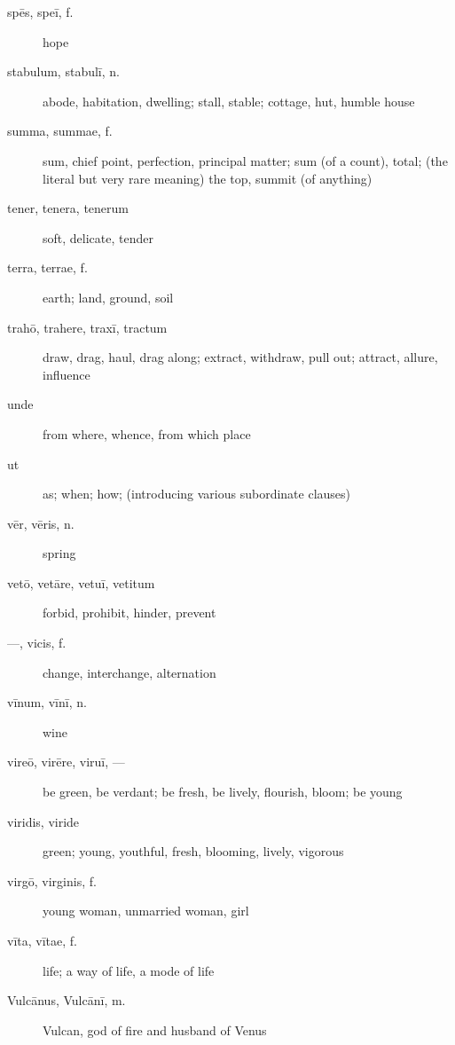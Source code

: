 \begin{description}
    \item[spēs, speī, f.] hope
    \item[stabulum, stabulī, n.] abode, habitation, dwelling; stall, stable; cottage, hut, humble house
    \item[summa, summae, f.] sum, chief point, perfection, principal matter; sum (of a count), total; (the literal but very rare meaning) the top, summit (of anything)
    \item[tener, tenera, tenerum] soft, delicate, tender
    \item[terra, terrae, f.] earth; land, ground, soil
    \item[trahō, trahere, traxī, tractum] draw, drag, haul, drag along; extract, withdraw, pull out; attract, allure, influence
    \item[unde] from where, whence, from which place
    \item[ut] as; when; how; (introducing various subordinate clauses)
    \item[vēr, vēris, n.] spring
    \item[vetō, vetāre, vetuī, vetitum] forbid, prohibit, hinder, prevent
    \item[---, vicis, f.] change, interchange, alternation
    \item[vīnum, vīnī, n.] wine
    \item[vireō, virēre, viruī, ---] be green, be verdant; be fresh, be lively, flourish, bloom; be young
    \item[viridis, viride] green; young, youthful, fresh, blooming, lively, vigorous
    \item[virgō, virginis, f.] young woman, unmarried woman, girl
    \item[vīta, vītae, f.] life; a way of life, a mode of life
    \item[Vulcānus, Vulcānī, m.] Vulcan, god of fire and husband of Venus
\end{description}
